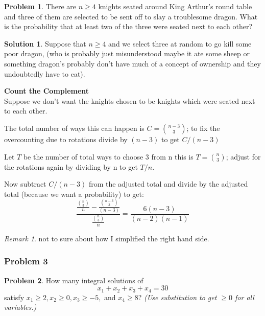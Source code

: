 \documentclass[10pt,a4paper,titlepage,twoside,draft]{article}
\theoremstyle{plain}
\theoremstyle{definition}
\newtheorem*{prob}{Problem}
\newtheorem*{sol}{Solution}
\theoremstyle{remark}
\newtheorem{rem}{Remark}
\begin{document}
\begin{prob}
    There are $n\geq4$ knights seated around King Arthur's round table and three of them are selected to be sent off to slay a troublesome dragon. What is the probability that at least two of the three were seated next to each other?
\end{prob}
    
\medskip    
    
\begin{sol}
    Suppose that $n \geq 4$ and we select three at random to go kill some poor dragon, (who is probably just misunderstood maybe it ate some sheep or something dragon's probably don't have much of a concept of ownership and they undoubtedly have to eat). 
 
\textbf{Count the Complement} \\
 
Suppose we don't want the knights chosen to be knights which were seated next to each other.
 
The total number of ways this can happen is $C = \binom{n-3}{3}$; to fix the overcounting due to rotations divide by $(n-3)$ to get $C/(n-3)$
 
Let $T$ be the number of total ways to choose 3 from n this is $T = \binom{n}{3}$; adjust for the rotations again by dividing by n to get $T/n$.
 
Now subtract $C/(n-3)$ from the adjusted total and divide by the adjusted total (because we want a probability) to get:
\[\frac{\frac{\binom{n}{3}}{n} - \frac{\binom{n-3}{3}}{(n-3)}}{\frac{\binom{n}{3}}{n}}= \frac{6(n-3)}{(n-2)(n-1)}\]
\end{sol}

\medskip

\begin{rem}
    not to sure about how I simplified the right hand side.
\end{rem}


\subsubsection{Problem 3}

\begin{prob}
How many integral solutions of
\[ x_1 + x_2 + x_3 + x_4 = 30 \]
satisfy $x_1 \geq 2, x_2 \geq 0, x_3 \geq -5,$ and $x_4 \geq 8$?
\emph{(Use substitution to get $ \geq 0$ for all variables.)}
\end{prob}    
    
\medskip
\end{document}
